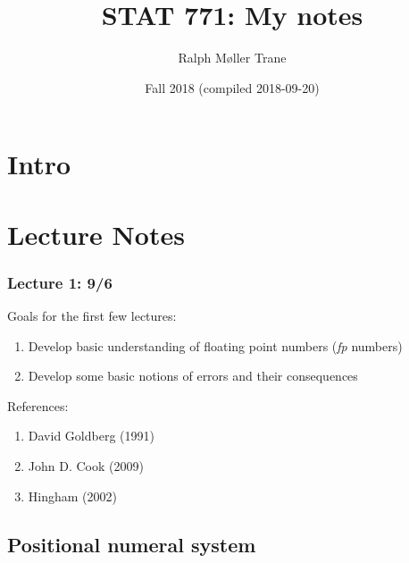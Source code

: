 \documentclass[]{book}
\title{STAT 771: My notes}
\author{Ralph Møller Trane}
\date{Fall 2018 (compiled 2018-09-20)}
\providecommand{\tightlist}{%
  \setlength{\itemsep}{0pt}\setlength{\parskip}{0pt}}
\theoremstyle{definition}
\theoremstyle{definition}
\theoremstyle{definition}
\theoremstyle{remark}
\begin{document}
\maketitle

{
\setcounter{tocdepth}{1}
\tableofcontents
}
\newcommand{\R}{\mathbb{R}}
\newcommand{\N}{\mathbb{N}}

\newcommand{\norm}[1]{\left \vert \left \vert #1 \right \vert \right \vert}

\newcommand{\argmin}{\text{argmin}}
\newcommand{\argmax}{\text{argmax}}

\chapter*{Intro}\label{intro}

\chapter{Lecture Notes}\label{lecture-notes}

\subsection*{Lecture 1: 9/6}\label{lecture-1-96}

Goals for the first few lectures:

\begin{enumerate}
\def\labelenumi{\arabic{enumi}.}
\tightlist
\item
  Develop basic understanding of floating point numbers (\emph{fp}
  numbers)
\item
  Develop some basic notions of errors and their consequences
\end{enumerate}

References:

\begin{enumerate}
\def\labelenumi{\roman{enumi}.}
\tightlist
\item
  David Goldberg (1991)
\item
  John D. Cook (2009)
\item
  Hingham (2002)
\end{enumerate}

\section{Positional numeral system}\label{positional-numeral-system}
\end{document}
